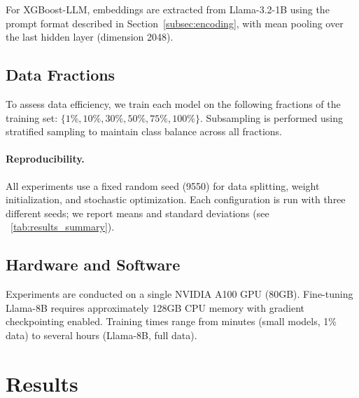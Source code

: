 \documentclass{article}
\theoremstyle{plain}
\theoremstyle{definition}
\theoremstyle{remark}
\begin{document}
For XGBoost-LLM, embeddings are extracted from Llama-3.2-1B using the prompt format described in Section~\ref{subsec:encoding}, with mean pooling over the last hidden layer (dimension 2048).

\subsection{Data Fractions}
\label{appendix:fractions}

To assess data efficiency, we train each model on the following fractions of the training set: $\{1\%, 10\%, 30\%, 50\%, 75\%, 100\%\}$. Subsampling is performed using stratified sampling to maintain class balance across all fractions.

\paragraph{Reproducibility.}
All experiments use a fixed random seed (9550) for data splitting, weight initialization, and stochastic optimization. Each configuration is run with three different seeds; we report means and standard deviations (see ~\ref{tab:results_summary}).

\subsection{Hardware and Software}
\label{appendix:hardware}

Experiments are conducted on a single NVIDIA A100 GPU (80GB). Fine-tuning Llama-8B requires approximately 128GB CPU memory with gradient checkpointing enabled. Training times range from minutes (small models, 1\% data) to several hours (Llama-8B, full data).


\newpage
\section{Results}
\label{appendix:results}
\end{document}
